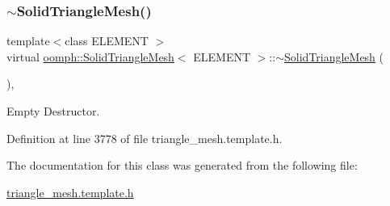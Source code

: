 \subsubsection{\texorpdfstring{$\sim$\+Solid\+Triangle\+Mesh()}{~SolidTriangleMesh()}}
{\footnotesize\ttfamily template$<$class E\+L\+E\+M\+E\+NT $>$ \\
virtual \hyperlink{classoomph_1_1SolidTriangleMesh}{oomph\+::\+Solid\+Triangle\+Mesh}$<$ E\+L\+E\+M\+E\+NT $>$\+::$\sim$\hyperlink{classoomph_1_1SolidTriangleMesh}{Solid\+Triangle\+Mesh} (\begin{DoxyParamCaption}{ }\end{DoxyParamCaption})\hspace{0.3cm}{\ttfamily [inline]}, {\ttfamily [virtual]}}



Empty Destructor. 



Definition at line 3778 of file triangle\+\_\+mesh.\+template.\+h.



The documentation for this class was generated from the following file\+:\begin{DoxyCompactItemize}
\item 
\hyperlink{triangle__mesh_8template_8h}{triangle\+\_\+mesh.\+template.\+h}\end{DoxyCompactItemize}
